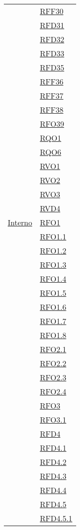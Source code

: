 \begin{longtable}{|>{\centering}m{5cm}|m{5cm}<{\centering}|}
& \hyperlink{RFF30}{RFF30}\\
& \hyperlink{RFD31}{RFD31}\\
& \hyperlink{RFD32}{RFD32}\\
& \hyperlink{RFD33}{RFD33}\\
& \hyperlink{RFD35}{RFD35}\\
& \hyperlink{RFF36}{RFF36}\\
& \hyperlink{RFF37}{RFF37}\\
& \hyperlink{RFF38}{RFF38}\\
& \hyperlink{RFO39}{RFO39}\\
& \hyperlink{RQO1}{RQO1}\\
& \hyperlink{RQO6}{RQO6}\\
& \hyperlink{RVO1}{RVO1}\\
& \hyperlink{RVO2}{RVO2}\\
& \hyperlink{RVO3}{RVO3}\\
& \hyperlink{RVD4}{RVD4}\\ \hline
\hyperlink{Interno}{Interno} & \hyperlink{RFO1}{RFO1}\\
& \hyperlink{RFO1.1}{RFO1.1}\\
& \hyperlink{RFO1.2}{RFO1.2}\\
& \hyperlink{RFO1.3}{RFO1.3}\\
& \hyperlink{RFO1.4}{RFO1.4}\\
& \hyperlink{RFO1.5}{RFO1.5}\\
& \hyperlink{RFO1.6}{RFO1.6}\\
& \hyperlink{RFO1.7}{RFO1.7}\\
& \hyperlink{RFO1.8}{RFO1.8}\\
& \hyperlink{RFO2.1}{RFO2.1}\\
& \hyperlink{RFO2.2}{RFO2.2}\\
& \hyperlink{RFO2.3}{RFO2.3}\\
& \hyperlink{RFO2.4}{RFO2.4}\\
& \hyperlink{RFO3}{RFO3}\\
& \hyperlink{RFO3.1}{RFO3.1}\\
& \hyperlink{RFD4}{RFD4}\\
& \hyperlink{RFD4.1}{RFD4.1}\\
& \hyperlink{RFD4.2}{RFD4.2}\\
& \hyperlink{RFD4.3}{RFD4.3}\\
& \hyperlink{RFD4.4}{RFD4.4}\\
& \hyperlink{RFD4.5}{RFD4.5}\\
& \hyperlink{RFD4.5.1}{RFD4.5.1}\\

\end{longtable}
